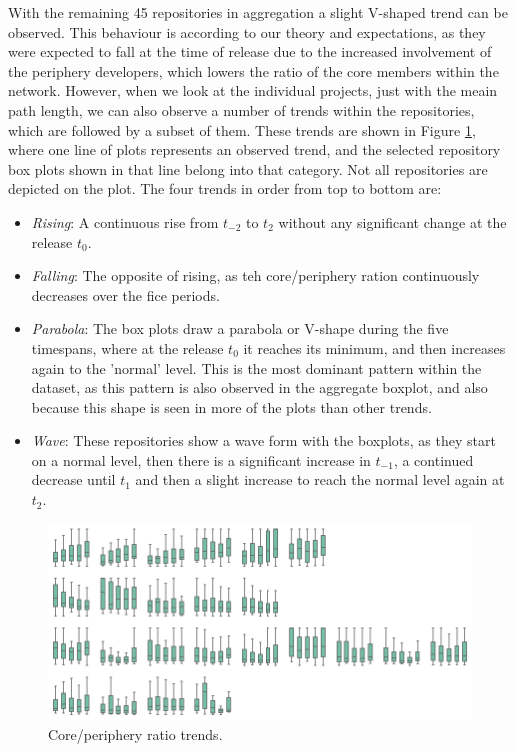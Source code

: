 With the remaining 45 repositories in aggregation a slight V-shaped trend can be observed. This behaviour is according to our theory and expectations, as they were expected to fall at the time of release due to the increased involvement of the periphery developers, which lowers the ratio of the core members within the network. However, when we look at the individual projects, just with the meain path length, we can also observe a number of trends within the repositories, which are followed by a subset of them. These trends are shown in Figure \ref{fig:cp-box-grid}, where one line of plots represents an observed trend, and the selected repository box plots shown in that line belong into that category. Not all repositories are depicted on the plot. The four trends in order from top to bottom are:

\begin{itemize}
    \item \textit{Rising}: A continuous rise from $t_{-2}$ to $t_2$ without any significant change at the release $t_0$.
    \item \textit{Falling}: The opposite of rising, as teh core/periphery ration continuously decreases over the fice periods.
    \item \textit{Parabola}: The box plots draw a parabola or V-shape during the five timespans, where at the release $t_0$ it reaches its minimum, and then increases again to the 'normal' level. This is the most dominant pattern within the dataset, as this pattern is also observed in the aggregate boxplot, and also because this shape is seen in more of the plots than other trends.
    \item \textit{Wave}: These repositories show a wave form with the boxplots, as they start on a normal level, then there is a significant increase in $t_{-1}$, a continued decrease until $t_1$ and then a slight increase to reach the normal level again at $t_2$.
\end{itemize}

\begin{figure}
    \centering
    \includegraphics[width=\textwidth]{figures/quantitative/boxplots/grid.png}
    \caption{Core/periphery ratio trends.}
    \label{fig:cp-box-grid}
\end{figure}


